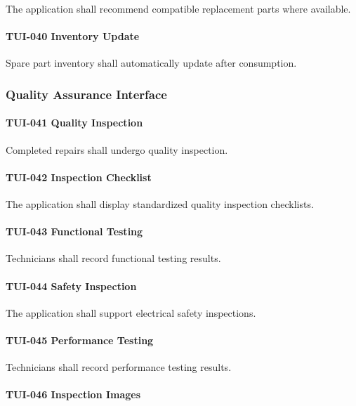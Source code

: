 The application shall recommend compatible replacement parts where
available.

\paragraph{TUI-040 Inventory Update}

Spare part inventory shall automatically update after consumption.


\subsubsection*{Quality Assurance Interface}

\paragraph{TUI-041 Quality Inspection}

Completed repairs shall undergo quality inspection.

\paragraph{TUI-042 Inspection Checklist}

The application shall display standardized quality inspection
checklists.

\paragraph{TUI-043 Functional Testing}

Technicians shall record functional testing results.

\paragraph{TUI-044 Safety Inspection}

The application shall support electrical safety inspections.

\paragraph{TUI-045 Performance Testing}

Technicians shall record performance testing results.

\paragraph{TUI-046 Inspection Images}

